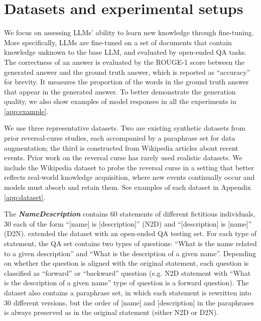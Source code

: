 \section{Datasets and experimental setups}

\label{sec:setup}

We focus on assessing LLMs' ability to learn new knowledge through fine-tuning. More specifically, LLMs are fine-tuned on a set of documents that contain knowledge unknown to the base LLM, and evaluated by open-ended QA tasks. The correctness of an answer is evaluated by the ROUGE-1 score \citep{lin2024delving, jiang2025anyedit} between the generated answer and the ground truth answer, which is reported as ``accuracy'' for brevity. It measures the proportion of the words in the ground truth answer that appear in the generated answer. To better demonstrate the generation quality, we also show examples of model responses in all the experiments in \ref{app:example}.    

We use three representative datasets. Two are existing synthetic datasets from prior reversal-curse studies, each accompanied by a paraphrase set for data augmentation; the third is constructed from Wikipedia articles about recent events. Prior work on the reversal curse has rarely used realistic datasets. We include the Wikipedia dataset to probe the reversal curse in a setting that better reflects real-world knowledge acquisition, where new events continually occur and models must absorb and retain them. See examples of each dataset in Appendix \ref{app:dataset}.

The \textbf{\textit{NameDescription}} \citep{berglund2023reversal} contains 60 statements of different fictitious individuals, 30 each of the form ``[name] is [description]'' (N2D) and ``[description] is [name]'' (D2N). \cite{lin2024delving} extended the dataset with an open-ended QA testing set. For each type of statement, the QA set contains two types of questions: ``What is the name related to a given description'' and ``What is the description of a given name''. Depending on whether the question is aligned with the original statement, each question is classified as ``forward'' or ``backward'' question (e.g. N2D statement with ``What is the description of a given name'' type of question is a forward question). The dataset also contains a paraphrase set, in which each statement is rewritten into 30 different versions, but the order of [name] and [description] in the paraphrases is always preserved as in the original statement (either N2D or D2N).

